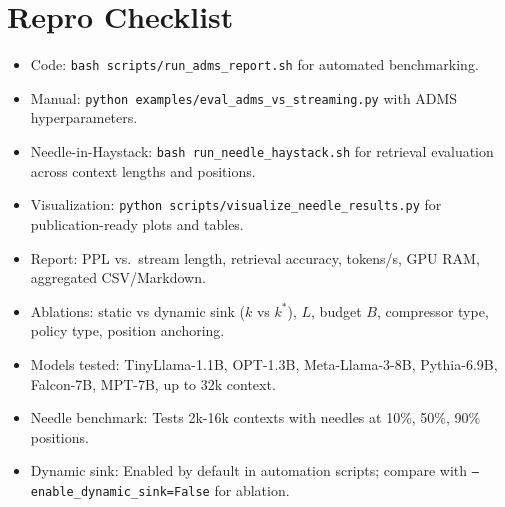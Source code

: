 \documentclass[11pt]{article}
\begin{document}
\section*{Repro Checklist}
\begin{itemize}
  \item Code: \texttt{bash scripts/run\_adms\_report.sh} for automated benchmarking.
  \item Manual: \texttt{python examples/eval\_adms\_vs\_streaming.py} with ADMS hyperparameters.
  \item Needle-in-Haystack: \texttt{bash run\_needle\_haystack.sh} for retrieval evaluation across context lengths and positions.
  \item Visualization: \texttt{python scripts/visualize\_needle\_results.py} for publication-ready plots and tables.
  \item Report: PPL vs.\ stream length, retrieval accuracy, tokens/s, GPU RAM, aggregated CSV/Markdown.
  \item Ablations: static vs dynamic sink ($k$ vs $k^*$), $L$, budget $B$, compressor type, policy type, position anchoring.
  \item Models tested: TinyLlama-1.1B, OPT-1.3B, Meta-Llama-3-8B, Pythia-6.9B, Falcon-7B, MPT-7B, up to 32k context.
  \item Needle benchmark: Tests 2k-16k contexts with needles at 10\%, 50\%, 90\% positions.
  \item Dynamic sink: Enabled by default in automation scripts; compare with \texttt{--enable\_dynamic\_sink=False} for ablation.
\end{itemize}
\end{document}
